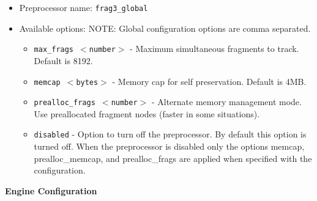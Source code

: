 \documentclass[english]{report}
\begin{document}
\begin{itemize}

\item Preprocessor name: \texttt{frag3\_global}

\item Available options: NOTE: Global configuration options are comma
separated.

\begin{itemize}

\item \texttt{max\_frags $<$number$>$} - Maximum simultaneous fragments to
track. Default is 8192.

\item \texttt{memcap $<$bytes$>$} - Memory cap for self preservation.  Default
is 4MB.  

\item \texttt{prealloc\_frags $<$number$>$} - Alternate memory management mode.
Use preallocated fragment nodes (faster in some situations).

\item \texttt{disabled} - Option to turn off the preprocessor. By default this
option is turned off. When the preprocessor is disabled only the options memcap, 
prealloc\_memcap, and prealloc\_frags are applied when specified with the configuration.

\end{itemize}                               
\end{itemize}    
 
\textbf{Engine Configuration}
\end{document}
